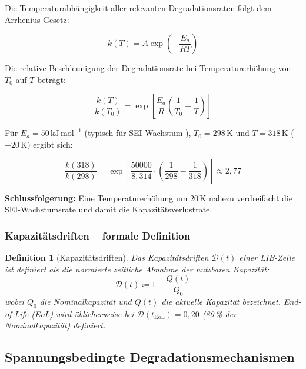 ﻿\documentclass[12pt,a4paper]{article}
\newtheorem{definition}{Definition}[section]
\begin{document}
	Die Temperaturabhängigkeit aller relevanten Degradationsraten folgt dem
	Arrhenius-Gesetz:
	
	\begin{equation}
		k(T) = A \exp\!\left(-\frac{E_a}{RT}\right)
		\label{eq:arrhenius}
	\end{equation}
	
	Die relative Beschleunigung der Degradationsrate bei Temperaturerhöhung von
	$T_0$ auf $T$ beträgt:
	
	\begin{equation}
		\frac{k(T)}{k(T_0)} = \exp\!\left[\frac{E_a}{R}\left(\frac{1}{T_0}-\frac{1}{T}\right)\right]
		\label{eq:arrhenius_ratio}
	\end{equation}
	
	Für $E_a = 50\,\mathrm{kJ\,mol^{-1}}$ (typisch für SEI-Wachstum \cite{Wang2011}),
	$T_0 = 298\,\mathrm{K}$ und $T = 318\,\mathrm{K}$ ($+20\,\mathrm{K}$) ergibt sich:
	
	\begin{equation}
		\frac{k(318)}{k(298)} = \exp\!\left[\frac{50000}{8{,}314}\cdot
		\left(\frac{1}{298}-\frac{1}{318}\right)\right] \approx 2{,}77
	\end{equation}
	
	\textbf{Schlussfolgerung:} Eine Temperaturerhöhung um $20\,\mathrm{K}$ nahezu
	verdreifacht die SEI-Wachstumsrate und damit die Kapazitätsverlustrate.
	
	\subsubsection{Kapazitätsdriften -- formale Definition}
	
	\begin{definition}[Kapazitätsdriften]
		Das Kapazitätsdriften $\mathcal{D}(t)$ einer LIB-Zelle ist definiert als
		die normierte zeitliche Abnahme der nutzbaren Kapazität:
		\begin{equation}
			\mathcal{D}(t) \coloneqq 1 - \frac{Q(t)}{Q_0}
		\end{equation}
		wobei $Q_0$ die Nominalkapazität und $Q(t)$ die aktuelle Kapazität bezeichnet.
		\textit{End-of-Life} (EoL) wird üblicherweise bei $\mathcal{D}(t_\mathrm{EoL}) = 0{,}20$
		(80\,\% der Nominalkapazität) definiert.
	\end{definition}
	
	\subsection{Spannungsbedingte Degradationsmechanismen}
	\label{subsec:volt_deg}
	
\end{document}
